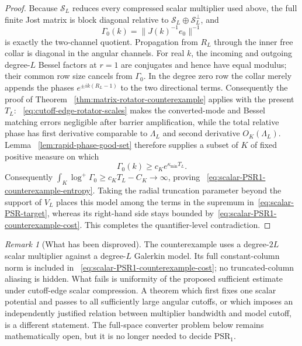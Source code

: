 \documentclass[11pt]{article}
\theoremstyle{definition}
\theoremstyle{remark}
\newtheorem{remark}[theorem]{Remark}
\begin{document}
\begin{proof}
Because $\mathcal S_L$ reduces every compressed scalar multiplier used above,
the full finite Jost matrix is block diagonal relative to
$\mathcal S_L\oplus\mathcal S_L^\perp$, and
\begin{equation}
 \Gamma_0(k)=\|J(k)^{-1}e_0\|^{-1}
\end{equation}
is exactly the two-channel quotient.  Propagation from $R_L$ through the inner
free collar is diagonal in the angular channels.  For real $k$, the incoming
and outgoing degree-$L$ Bessel factors at $r=1$ are conjugates and hence have
equal modulus; their common row size cancels from $\Gamma_0$.  In the degree
zero row the collar merely appends the phases $e^{\pm ik(R_L-1)}$ to the two
directional terms.  Consequently the proof of Theorem
~\ref{thm:matrix-rotator-counterexample} applies with the present $T_L$:
~\eqref{eq:cutoff-edge-rotator-scales} makes the converted-mode and Bessel
matching errors negligible after barrier amplification, while the total
relative phase has first derivative comparable to $\Lambda_L$ and second
derivative $O_K(\Lambda_L)$.  Lemma
~\ref{lem:rapid-phase-good-set} therefore supplies a subset of $K$ of fixed
positive measure on which
\begin{equation}
 \Gamma_0(k)\geq c_Ke^{\kappa_{\min}T_L}.
\end{equation}
Consequently
$\int_K\log^+\Gamma_0\geq c_KT_L-C_K\to\infty$, proving
~\eqref{eq:scalar-PSR1-counterexample-entropy}.  Taking the radial truncation
parameter beyond the support of $V_L$ places this model among the terms in the
supremum in~\eqref{eq:scalar-PSR-target}, whereas its right-hand side stays
bounded by~\eqref{eq:scalar-PSR1-counterexample-cost}.  This completes the
quantifier-level contradiction.
\end{proof}

\begin{remark}[What has been disproved]
The counterexample uses a degree-$2L$ scalar multiplier against a degree-$L$
Galerkin model.  Its full constant-column norm is included in
~\eqref{eq:scalar-PSR1-counterexample-cost}; no truncated-column aliasing is
hidden.  What fails is uniformity of the proposed sufficient estimate under
cutoff-edge scalar compression.  A theorem which first fixes one scalar
potential and passes to all sufficiently large angular cutoffs, or which
imposes an independently justified relation between multiplier bandwidth and
model cutoff, is a different statement.  The full-space converter problem
below remains mathematically open, but it is no longer needed to decide
$\mathrm{PSR}_1$.
\end{remark}
\end{document}
